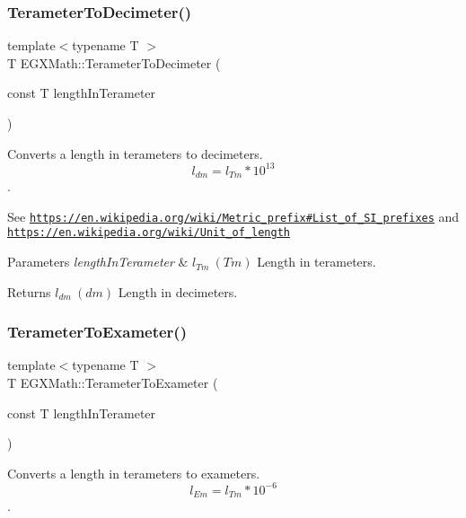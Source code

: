 \subsubsection{\texorpdfstring{Terameter\+To\+Decimeter()}{TerameterToDecimeter()}}
{\footnotesize\ttfamily template$<$typename T $>$ \\
T E\+G\+X\+Math\+::\+Terameter\+To\+Decimeter (\begin{DoxyParamCaption}\item[{const T}]{length\+In\+Terameter }\end{DoxyParamCaption})}



Converts a length in terameters to decimeters. \[ l_{dm}=l_{Tm} * 10^{13} \]. 

See \href{https://en.wikipedia.org/wiki/Metric_prefix#List_of_SI_prefixes}{\tt https\+://en.\+wikipedia.\+org/wiki/\+Metric\+\_\+prefix\#\+List\+\_\+of\+\_\+\+S\+I\+\_\+prefixes} and \href{https://en.wikipedia.org/wiki/Unit_of_length}{\tt https\+://en.\+wikipedia.\+org/wiki/\+Unit\+\_\+of\+\_\+length} 
\begin{DoxyParams}{Parameters}
{\em length\+In\+Terameter} & $ l_{Tm}\ (Tm)$ Length in terameters. \\
\hline
\end{DoxyParams}
\begin{DoxyReturn}{Returns}
$ l_{dm}\ (dm)$ Length in decimeters. 
\end{DoxyReturn}
\mbox{\label{group___e_g_x_math-_conversions-_length_conversions-_s_i-_terameter-_s_i_ga9b268bd91e8ba4853c2732b80bca0539}} 
\subsubsection{\texorpdfstring{Terameter\+To\+Exameter()}{TerameterToExameter()}}
{\footnotesize\ttfamily template$<$typename T $>$ \\
T E\+G\+X\+Math\+::\+Terameter\+To\+Exameter (\begin{DoxyParamCaption}\item[{const T}]{length\+In\+Terameter }\end{DoxyParamCaption})}



Converts a length in terameters to exameters. \[ l_{Em}=l_{Tm} * 10^{-6} \]. 

